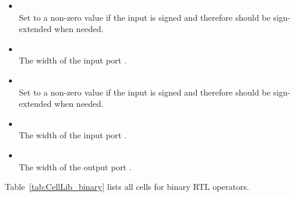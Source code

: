 \begin{itemize}
\item {} \\
Set to a non-zero value if the input  is signed and therefore should be sign-extended
when needed.

\item {} \\
The width of the input port .

\item {} \\
Set to a non-zero value if the input  is signed and therefore should be sign-extended
when needed.

\item {} \\
The width of the input port .

\item {} \\
The width of the output port .
\end{itemize}

Table~\ref{tab:CellLib_binary} lists all cells for binary RTL operators.

